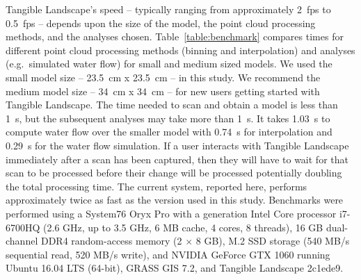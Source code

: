 \documentclass[prodmode,acmtochi]{acmsmall} %
\begin{document}
Tangible Landscape's speed 
-- typically ranging from approximately 2~fps to 0.5~fps -- 
depends upon the size of the model, 
the point cloud processing methods, 
and the analyses chosen. 
%
Table~\ref{table:benchmark} compares
times for different point cloud processing
methods (binning and interpolation) 
and analyses (e.g.~simulated water flow)
for small and medium sized models.
We used the small model size 
-- 23.5~cm x 23.5~cm --
in this study. 
We recommend the medium model size 
-- 34~cm x 34~cm --
for new users getting started with Tangible Landscape.
%
The time needed to scan and obtain a model is less than 1~s, 
but the subsequent analyses may take more than 1~s.
It takes 1.03~s to
compute water flow over the smaller model 
with 0.74~s  for interpolation
and 0.29~s for the water flow simulation.
%
If a user interacts with Tangible Landscape 
immediately after a scan has been captured,
then they will have to wait for that scan to be processed
before their change will be processed
potentially doubling the total processing time.
%
The current system, reported here,
performs approximately twice as fast as
the version used in this study.
%
Benchmarks were performed using a
System76 Oryx Pro with
a  generation Intel Core processor i7-6700HQ (2.6 GHz, up to 3.5 GHz, 6 MB cache, 4 cores, 8 threads),
16 GB dual-channel DDR4 random-access memory (2 $\times$ 8 GB),
M.2 SSD storage (540 MB/s sequential read, 520 MB/s write), and
NVIDIA GeForce GTX 1060
running Ubuntu 16.04 LTS (64-bit),
GRASS GIS 7.2, and
Tangible Landscape 2c1ede9.
%
\end{document}
